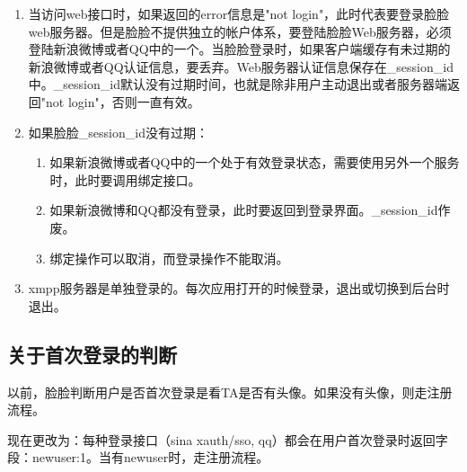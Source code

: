 \begin{enumerate}

\item 当访问web接口时，如果返回的error信息是"not login"，此时代表要登录脸脸web服务器。但是脸脸不提供独立的帐户体系，要登陆脸脸Web服务器，必须登陆新浪微博或者QQ中的一个。当脸脸登录时，如果客户端缓存有未过期的新浪微博或者QQ认证信息，要丢弃。Web服务器认证信息保存在\_session\_id中。\_session\_id默认没有过期时间，也就是除非用户主动退出或者服务器端返回"not login"，否则一直有效。
\item 如果脸脸\_session\_id没有过期：
\begin{enumerate}

\item 如果新浪微博或者QQ中的一个处于有效登录状态，需要使用另外一个服务时，此时要调用绑定接口。
\item 如果新浪微博和QQ都没有登录，此时要返回到登录界面。\_session\_id作废。
\item 绑定操作可以取消，而登录操作不能取消。
\end{enumerate}

\item xmpp服务器是单独登录的。每次应用打开的时候登录，退出或切换到后台时退出。
\end{enumerate}


\subsection{关于首次登录的判断}
以前，脸脸判断用户是否首次登录是看TA是否有头像。如果没有头像，则走注册流程。

现在更改为：每种登录接口（sina xauth/sso, qq）都会在用户首次登录时返回字段：{newuser:1}。当有newuser时，走注册流程。
